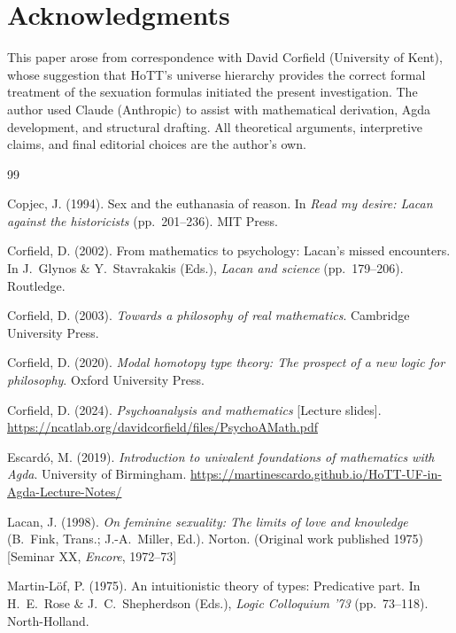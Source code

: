 \documentclass[12pt]{article}
\theoremstyle{definition}
\theoremstyle{remark}
\begin{document}
\section*{Acknowledgments}

This paper arose from correspondence with David Corfield (University of Kent), whose suggestion that HoTT's universe hierarchy provides the correct formal treatment of the sexuation formulas initiated the present investigation. The author used Claude (Anthropic) to assist with mathematical derivation, Agda development, and structural drafting. All theoretical arguments, interpretive claims, and final editorial choices are the author's own.

\begin{thebibliography}{99}

Copjec, J. (1994). Sex and the euthanasia of reason. In \textit{Read my desire: Lacan against the historicists} (pp.~201--236). MIT Press.

Corfield, D. (2002). From mathematics to psychology: Lacan's missed encounters. In J.~Glynos \& Y.~Stavrakakis (Eds.), \textit{Lacan and science} (pp.~179--206). Routledge.

Corfield, D. (2003). \textit{Towards a philosophy of real mathematics}. Cambridge University Press.

Corfield, D. (2020). \textit{Modal homotopy type theory: The prospect of a new logic for philosophy}. Oxford University Press.

Corfield, D. (2024). \textit{Psychoanalysis and mathematics} [Lecture slides]. \url{https://ncatlab.org/davidcorfield/files/PsychoAMath.pdf}

Escardó, M. (2019). \textit{Introduction to univalent foundations of mathematics with Agda}. University of Birmingham. \url{https://martinescardo.github.io/HoTT-UF-in-Agda-Lecture-Notes/}

Lacan, J. (1998). \textit{On feminine sexuality: The limits of love and knowledge} (B.~Fink, Trans.; J.-A.~Miller, Ed.). Norton. (Original work published 1975) [Seminar XX, \textit{Encore}, 1972--73]

Martin-Löf, P. (1975). An intuitionistic theory of types: Predicative part. In H.~E.~Rose \& J.~C.~Shepherdson (Eds.), \textit{Logic Colloquium '73} (pp.~73--118). North-Holland.


\end{thebibliography}
\end{document}
